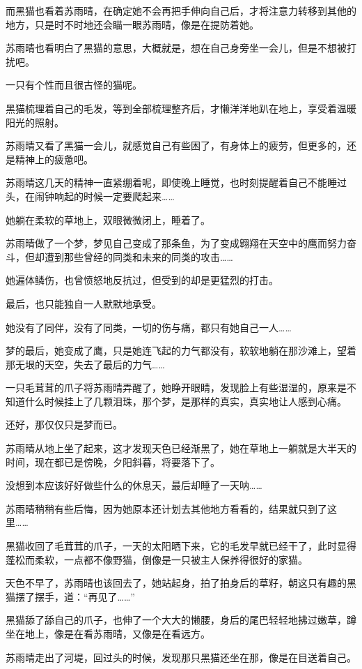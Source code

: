 而黑猫也看着苏雨晴，在确定她不会再把手伸向自己后，才将注意力转移到其他的地方，只是时不时地还会瞄一眼苏雨晴，像是在提防着她。

苏雨晴也看明白了黑猫的意思，大概就是，想在自己身旁坐一会儿，但是不想被打扰吧。

一只有个性而且很古怪的猫呢。

黑猫梳理着自己的毛发，等到全部梳理整齐后，才懒洋洋地趴在地上，享受着温暖阳光的照射。

苏雨晴又看了黑猫一会儿，就感觉自己有些困了，有身体上的疲劳，但更多的，还是精神上的疲惫吧。

苏雨晴这几天的精神一直紧绷着呢，即使晚上睡觉，也时刻提醒着自己不能睡过头，在闹钟响起的时候一定要爬起来……

她躺在柔软的草地上，双眼微微闭上，睡着了。

苏雨晴做了一个梦，梦见自己变成了那条鱼，为了变成翱翔在天空中的鹰而努力奋斗，但却遭到那些曾经的同类和未来的同类的攻击……

她遍体鳞伤，也曾愤怒地反抗过，但受到的却是更猛烈的打击。

最后，也只能独自一人默默地承受。

她没有了同伴，没有了同类，一切的伤与痛，都只有她自己一人……

梦的最后，她变成了鹰，只是她连飞起的力气都没有，软软地躺在那沙滩上，望着那无垠的天空，失去了最后的力气……

一只毛茸茸的爪子将苏雨晴弄醒了，她睁开眼睛，发现脸上有些湿湿的，原来是不知道什么时候挂上了几颗泪珠，那个梦，是那样的真实，真实地让人感到心痛。

还好，那仅仅只是梦而已。

苏雨晴从地上坐了起来，这才发现天色已经渐黑了，她在草地上一躺就是大半天的时间，现在都已是傍晚，夕阳斜暮，将要落下了。

没想到本应该好好做些什么的休息天，最后却睡了一天呐……

苏雨晴稍稍有些后悔，因为她原本还计划去其他地方看看的，结果就只到了这里……

黑猫收回了毛茸茸的爪子，一天的太阳晒下来，它的毛发早就已经干了，此时显得蓬松而柔软，一点都不像野猫，倒像是一只被主人保养得很好的家猫。

天色不早了，苏雨晴也该回去了，她站起身，拍了拍身后的草籽，朝这只有趣的黑猫摆了摆手，道：“再见了……”

黑猫舔了舔自己的爪子，也伸了一个大大的懒腰，身后的尾巴轻轻地拂过嫩草，蹲坐在地上，像是在看苏雨晴，又像是在看远方。

苏雨晴走出了河堤，回过头的时候，发现那只黑猫还坐在那，像是在目送着自己。

